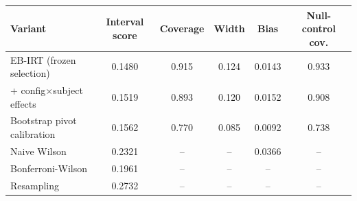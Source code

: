 \begin{tabular}{lccccc}
\toprule
Variant & Interval score & Coverage & Width & Bias & Null-control cov. \\
\midrule
EB-IRT (frozen selection) & 0.1480 & 0.915 & 0.124 & 0.0143 & 0.933 \\
+ config$\times$subject effects & 0.1519 & 0.893 & 0.120 & 0.0152 & 0.908 \\
Bootstrap pivot calibration & 0.1562 & 0.770 & 0.085 & 0.0092 & 0.738 \\
\midrule
Naive Wilson & 0.2321 & -- & -- & 0.0366 & -- \\
Bonferroni-Wilson & 0.1961 & -- & -- & -- & -- \\
Resampling & 0.2732 & -- & -- & -- & -- \\
\bottomrule
\end{tabular}
